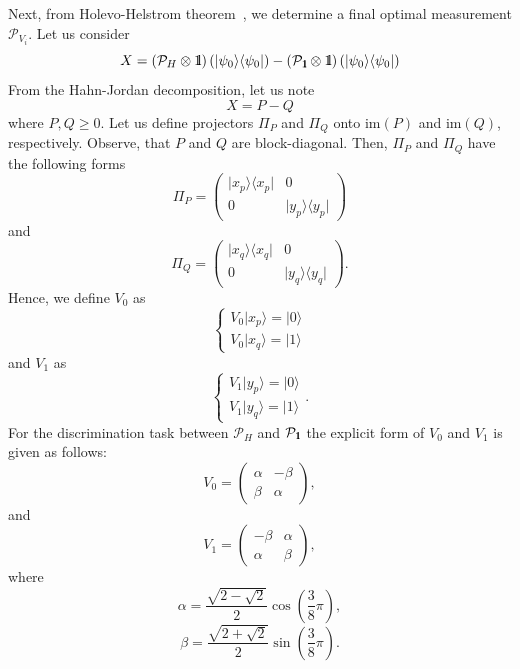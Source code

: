 \documentclass[preprint,12pt, a4paper, dvipsnames]{elsarticle}
\newcommand{\ket}[1]{\ensuremath{|#1\rangle}}
\newcommand{\bra}[1]{\ensuremath{\langle#1|}}
\newcommand{\ketbra}[2]{\ensuremath{\ket{#1}\bra{#2}}}
\newcommand{\proj}[1]{\ensuremath{\ketbra{#1}{#1}}}
\newcommand{\1}{{\rm 1\hspace{-0.9mm}l}}
\newcommand{\Id}{{\rm 1\hspace{-0.9mm}l}}
\newcommand{\PP}{\mathcal{P}}
\begin{document}
 Next, from Holevo-Helstrom theorem~\cite{watrous}, we determine a final optimal measurement $\PP_{V_i}$. 
 Let us consider \begin{equation}
 X = \left(\PP_{H} \otimes \Id \right)(\proj{\psi_0}) - \left(\PP_{\Id} \otimes \Id \right) (\proj{\psi_0})
  \end{equation}
 From the Hahn-Jordan decomposition, let us note
 \begin{equation}
 X = P - Q
 \end{equation}
 where $P, Q \ge 0 $.
 Let us define projectors $\Pi_P$ and $\Pi_Q$ onto  $\text{im}(P)$ and $\text{im}(Q)$,
 respectively. Observe, that $P $ and $Q$ are block-diagonal.  Then,  $\Pi_P$ and $\Pi_Q$ have the following forms
 \begin{equation}
 \Pi_P = \left(\begin{array}{cc}\proj{x_p}&0\\0&\proj{y_p}\end{array}\right)
 \end{equation}
 and
 \begin{equation}
 \Pi_Q = \left(\begin{array}{cc}\proj{x_q}&0\\0&\proj{y_q}\end{array}\right).
 \end{equation}
 Hence, we define $V_0$ as
 \begin{equation}
 \begin{cases} V_0 \ket{x_p} = \ket{0} \\ V_0 \ket{x_q} = \ket{1} \end{cases}
 \end{equation}
 and $V_1$ as
 \begin{equation}
 \begin{cases}
 V_1 \ket{y_p} = \ket{0} \\
 V_1 \ket{y_q} = \ket{1}
 \end{cases}.
 \end{equation}
 For the discrimination task between $\PP_{H}$ and $\PP_{\Id}$ the explicit form of $V_0$ and $V_1$ is given as
 follows: 
 \begin{equation}
 V_0 =
 \left(\begin{array}{cc} \alpha & -\beta\\ \beta & \alpha \end{array}\right),
 \end{equation}
 and \begin{equation}
 V_1 =
 \left(\begin{array}{cc} -\beta & \alpha \\ \alpha & \beta \end{array}\right),
 \end{equation}
 where \begin{equation}
 \alpha = \frac{\sqrt{2 - \sqrt{2}}}{2} \cos\left( \frac{3}{8} \pi \right),
 \end{equation}
 \begin{equation}
 \beta  = \frac{\sqrt{2  + \sqrt{2}}}{2} \sin\left( \frac{3}{8} \pi \right).
 \end{equation}
 
\end{document}
